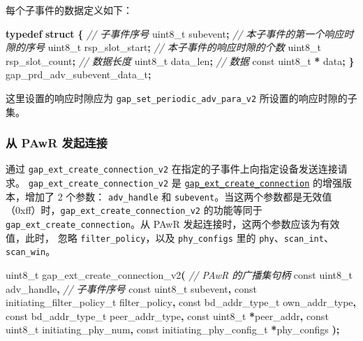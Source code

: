 \documentclass[
  12pt,
]{book}
\newenvironment{Shaded}{\begin{snugshade}}{\end{snugshade}}
\newcommand{\CommentTok}[1]{\textcolor[rgb]{0.56,0.35,0.01}{\textit{#1}}}
\newcommand{\DataTypeTok}[1]{\textcolor[rgb]{0.13,0.29,0.53}{#1}}
\newcommand{\KeywordTok}[1]{\textcolor[rgb]{0.13,0.29,0.53}{\textbf{#1}}}
\newcommand{\NormalTok}[1]{#1}
\newcommand{\OperatorTok}[1]{\textcolor[rgb]{0.81,0.36,0.00}{\textbf{#1}}}
\begin{document}
每个子事件的数据定义如下：

\begin{Shaded}
\begin{Highlighting}[]
\KeywordTok{typedef} \KeywordTok{struct}
\OperatorTok{\{}
    \CommentTok{// 子事件序号}
    \DataTypeTok{uint8\_t}\NormalTok{         subevent}\OperatorTok{;}
    \CommentTok{// 本子事件的第一个响应时隙的序号}
    \DataTypeTok{uint8\_t}\NormalTok{         rsp\_slot\_start}\OperatorTok{;}
    \CommentTok{// 本子事件的响应时隙的个数}
    \DataTypeTok{uint8\_t}\NormalTok{         rsp\_slot\_count}\OperatorTok{;}
    \CommentTok{// 数据长度}
    \DataTypeTok{uint8\_t}\NormalTok{         data\_len}\OperatorTok{;}
    \CommentTok{// 数据}
    \DataTypeTok{const} \DataTypeTok{uint8\_t} \OperatorTok{*}\NormalTok{ data}\OperatorTok{;}
\OperatorTok{\}}\NormalTok{ gap\_prd\_adv\_subevent\_data\_t}\OperatorTok{;}
\end{Highlighting}
\end{Shaded}

这里设置的响应时隙应为 \texttt{gap\_set\_periodic\_adv\_para\_v2} 所设置的响应时隙的子集。

\hypertarget{ch-adv-create-connection}{%
\subsubsection{从 PAwR 发起连接}\label{ch-adv-create-connection}}

通过 \texttt{gap\_ext\_create\_connection\_v2} 在指定的子事件上向指定设备发送连接请求。
\texttt{gap\_ext\_create\_connection\_v2} 是 \protect\hyperlink{ch-scan-create-connection}{\texttt{gap\_ext\_create\_connection}}
的增强版本，增加了 2 个参数：
\texttt{adv\_handle} 和 \texttt{subevent}。当这两个参数都是无效值（0xff）时，\texttt{gap\_ext\_create\_connection\_v2}
的功能等同于 \texttt{gap\_ext\_create\_connection}。从 PAwR 发起连接时，这两个参数应该为有效值，此时， 忽略
\texttt{filter\_policy}，以及 \texttt{phy\_configs} 里的 \texttt{phy}、\texttt{scan\_int}、\texttt{scan\_win}。

\begin{Shaded}
\begin{Highlighting}[]
\DataTypeTok{uint8\_t}\NormalTok{ gap\_ext\_create\_connection\_v2}\OperatorTok{(}
  \CommentTok{// PAwR 的广播集句柄}
  \DataTypeTok{const} \DataTypeTok{uint8\_t}\NormalTok{ adv\_handle}\OperatorTok{,}
  \CommentTok{// 子事件序号}
  \DataTypeTok{const} \DataTypeTok{uint8\_t}\NormalTok{ subevent}\OperatorTok{,}
  \DataTypeTok{const}\NormalTok{ initiating\_filter\_policy\_t filter\_policy}\OperatorTok{,}
  \DataTypeTok{const}\NormalTok{ bd\_addr\_type\_t own\_addr\_type}\OperatorTok{,}
  \DataTypeTok{const}\NormalTok{ bd\_addr\_type\_t peer\_addr\_type}\OperatorTok{,}
  \DataTypeTok{const} \DataTypeTok{uint8\_t} \OperatorTok{*}\NormalTok{peer\_addr}\OperatorTok{,}
  \DataTypeTok{const} \DataTypeTok{uint8\_t}\NormalTok{ initiating\_phy\_num}\OperatorTok{,}
  \DataTypeTok{const}\NormalTok{ initiating\_phy\_config\_t }\OperatorTok{*}\NormalTok{phy\_configs}
  \OperatorTok{);}
\end{Highlighting}
\end{Shaded}
\end{document}
